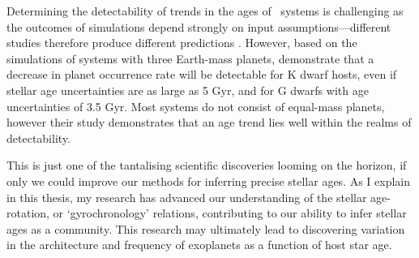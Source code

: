 
Determining the detectability of trends in the ages of \Kepler\ systems is
challenging as the outcomes of simulations depend strongly on input
assumptions---different studies therefore produce different predictions
\citep[see figure 3 of][]{Pu2015}.
However, based on the \citet{Smith2009} simulations of systems with three
Earth-mass planets, \citet{Veras2015} demonstrate that a decrease in planet
occurrence rate will be detectable for K dwarf hosts, even if stellar age
uncertainties are as large as 5 Gyr, and for G dwarfs with age uncertainties of
3.5 Gyr.
Most systems do not consist of equal-mass planets, however their study
demonstrates that an age trend lies well within the realms of detectability.

This is just one of the tantalising scientific discoveries looming on the
horizon, if only we could improve our methods for inferring precise stellar
ages.
As I explain in this thesis, my research has advanced our understanding of the
stellar age-rotation, or `gyrochronology' relations, contributing to our
ability to infer stellar ages as a community.
This research may ultimately lead to discovering variation in the architecture
and frequency of exoplanets as a function of host star age.

